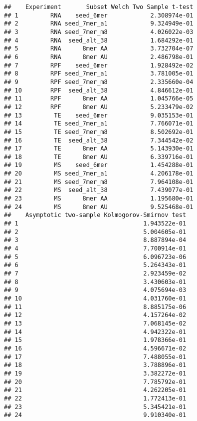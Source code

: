 \documentclass[
]{article}
\begin{document}
\begin{verbatim}
##    Experiment       Subset Welch Two Sample t-test
## 1         RNA    seed_6mer            2.308974e-01
## 2         RNA seed_7mer_a1            9.324949e-01
## 3         RNA seed_7mer_m8            4.026022e-03
## 4         RNA  seed_alt_38            1.684292e-01
## 5         RNA      8mer AA            3.732704e-07
## 6         RNA      8mer AU            2.486798e-01
## 7         RPF    seed_6mer            1.928492e-02
## 8         RPF seed_7mer_a1            3.781005e-01
## 9         RPF seed_7mer_m8            2.335660e-04
## 10        RPF  seed_alt_38            4.846612e-01
## 11        RPF      8mer AA            1.045766e-05
## 12        RPF      8mer AU            5.233479e-02
## 13         TE    seed_6mer            9.035153e-01
## 14         TE seed_7mer_a1            7.766071e-01
## 15         TE seed_7mer_m8            8.502692e-01
## 16         TE  seed_alt_38            7.344542e-02
## 17         TE      8mer AA            5.143930e-01
## 18         TE      8mer AU            6.339716e-01
## 19         MS    seed_6mer            1.454288e-01
## 20         MS seed_7mer_a1            4.206178e-01
## 21         MS seed_7mer_m8            7.964108e-01
## 22         MS  seed_alt_38            7.439077e-01
## 23         MS      8mer AA            1.195680e-01
## 24         MS      8mer AU            9.525468e-01
##    Asymptotic two-sample Kolmogorov-Smirnov test
## 1                                   1.943522e-01
## 2                                   5.004605e-01
## 3                                   8.887894e-04
## 4                                   7.700914e-01
## 5                                   6.096723e-06
## 6                                   5.264343e-01
## 7                                   2.923459e-02
## 8                                   3.430603e-01
## 9                                   4.075694e-03
## 10                                  4.031760e-01
## 11                                  8.885175e-06
## 12                                  4.157264e-02
## 13                                  7.068145e-02
## 14                                  4.942322e-01
## 15                                  1.978366e-01
## 16                                  4.596671e-02
## 17                                  7.488055e-01
## 18                                  3.788896e-01
## 19                                  3.382272e-01
## 20                                  7.785792e-01
## 21                                  4.262205e-01
## 22                                  1.772413e-01
## 23                                  5.345421e-01
## 24                                  9.910340e-01
\end{verbatim}
\end{document}
